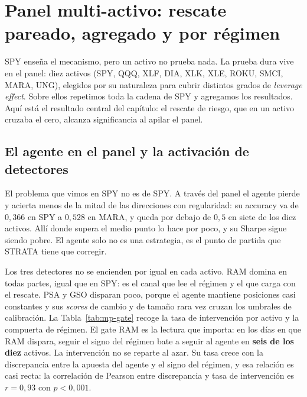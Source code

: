 \section{Panel multi-activo: rescate pareado, agregado y por régimen}
\label{sec:mp-panel}


SPY enseña el mecanismo, pero un activo no prueba nada. La prueba dura vive en el panel: diez activos (SPY, QQQ, XLF, DIA, XLK, XLE, ROKU, SMCI, MARA, UNG), elegidos por su naturaleza para cubrir distintos grados de \emph{leverage effect}. Sobre ellos repetimos toda la cadena de SPY y agregamos los resultados. Aquí está el resultado central del capítulo: el rescate de riesgo, que en un activo cruzaba el cero, alcanza significancia al apilar el panel.

\subsection{El agente en el panel y la activación de detectores}
\label{sec:mp-panel-agente}

El problema que vimos en SPY no es de SPY. A través del panel el agente pierde y acierta menos de la mitad de las direcciones con regularidad: su accuracy va de $0{,}366$ en SPY a $0{,}528$ en MARA, y queda por debajo de $0{,}5$ en siete de los diez activos. Allí donde supera el medio punto lo hace por poco, y su Sharpe sigue siendo pobre. El agente solo no es una estrategia, es el punto de partida que STRATA tiene que corregir.

Los tres detectores no se encienden por igual en cada activo. RAM domina en todas partes, igual que en SPY: es el canal que lee el régimen y el que carga con el rescate. PSA y GSO disparan poco, porque el agente mantiene posiciones casi constantes y sus \emph{scores} de cambio y de tamaño rara vez cruzan los umbrales de calibración. La Tabla~\ref{tab:mp-gate} recoge la tasa de intervención por activo y la compuerta de régimen. El gate RAM es la lectura que importa: en los días en que RAM dispara, seguir el signo del régimen bate a seguir al agente en \textbf{seis de los diez} activos. La intervención no se reparte al azar. Su tasa crece con la discrepancia entre la apuesta del agente y el signo del régimen, y esa relación es casi recta: la correlación de Pearson entre discrepancia y tasa de intervención es $r = 0{,}93$ con $p < 0{,}001$.

